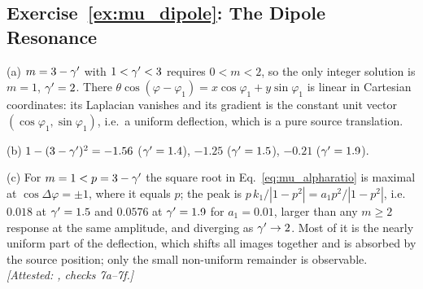 \subsection*{Exercise~\ref{ex:mu_dipole}: The Dipole Resonance}

(a) $m = 3-\gamma'$ with $1<\gamma'<3$ requires $0<m<2$, so the only
integer solution is $m=1$, $\gamma'=2$.  There
$\theta\cos(\varphi-\varphi_1) = x\cos\varphi_1 + y\sin\varphi_1$ is
linear in Cartesian coordinates: its Laplacian vanishes and its gradient
is the constant unit vector $(\cos\varphi_1,\sin\varphi_1)$, i.e.\ a
uniform deflection, which is a pure source translation.

(b) $1-(3-\gamma')^2 = -1.56$ ($\gamma'=1.4$), $-1.25$ ($\gamma'=1.5$),
$-0.21$ ($\gamma'=1.9$).

(c) For $m=1<p=3-\gamma'$ the square root in
Eq.~\eqref{eq:mu_alpharatio} is maximal at $\cos\Delta\varphi=\pm1$,
where it equals $p$; the peak is $p\,k_1/|1-p^2| = a_1p^2/|1-p^2|$,
i.e.\ $0.018$ at $\gamma'=1.5$ and $0.0576$ at $\gamma'=1.9$ for $a_1=0.01$,
larger than any $m\ge2$ response at the same amplitude, and diverging
as $\gamma'\to2$.  Most of it is the nearly uniform part of the deflection,
which shifts all images together and is absorbed by the source
position; only the small non-uniform remainder is observable.
\emph{[Attested: ,
checks 7a--7f.]}
